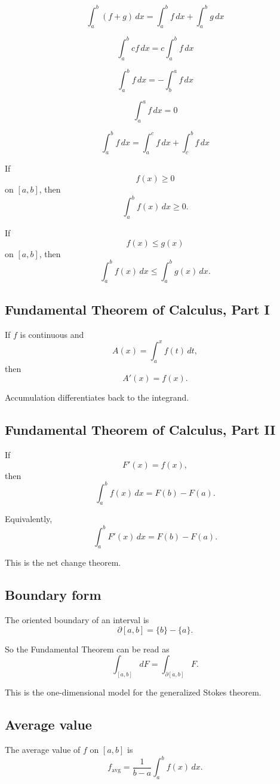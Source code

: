 \[
\int_a^b (f+g)\,dx
=
\int_a^b f\,dx+\int_a^b g\,dx
\]

\[
\int_a^b cf\,dx
=
c\int_a^b f\,dx
\]

\[
\int_a^b f\,dx
=
-\int_b^a f\,dx
\]

\[
\int_a^a f\,dx=0
\]

\[
\int_a^b f\,dx
=
\int_a^c f\,dx+\int_c^b f\,dx
\]

If
\[
    f(x)\ge0
\]
on \([a,b]\), then
\[
    \int_a^b f(x)\,dx\ge0.
\]

If
\[
    f(x)\le g(x)
\]
on \([a,b]\), then
\[
    \int_a^b f(x)\,dx\le \int_a^b g(x)\,dx.
\]

\subsection*{Fundamental Theorem of Calculus, Part I}

If \(f\) is continuous and
\[
    A(x)=\int_a^x f(t)\,dt,
\]
then
\[
\boxed{
    A'(x)=f(x).
}
\]

Accumulation differentiates back to the integrand.

\subsection*{Fundamental Theorem of Calculus, Part II}

If
\[
    F'(x)=f(x),
\]
then
\[
\boxed{
    \int_a^b f(x)\,dx=F(b)-F(a).
}
\]

Equivalently,
\[
\boxed{
    \int_a^b F'(x)\,dx=F(b)-F(a).
}
\]

This is the net change theorem.

\subsection*{Boundary form}

The oriented boundary of an interval is
\[
\boxed{
    \partial[a,b]=\{b\}-\{a\}.
}
\]

So the Fundamental Theorem can be read as
\[
\boxed{
    \int_{[a,b]} dF=\int_{\partial[a,b]}F.
}
\]

This is the one-dimensional model for the generalized Stokes theorem.

\subsection*{Average value}

The average value of \(f\) on \([a,b]\) is
\[
\boxed{
    f_{\operatorname{avg}}
    =
    \frac{1}{b-a}\int_a^b f(x)\,dx.
}
\]

